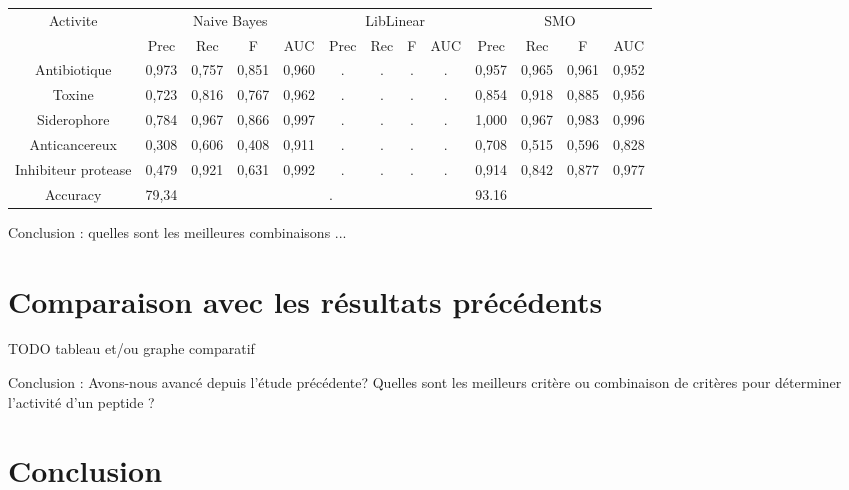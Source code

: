 \documentclass[a4paper,10pt]{report}
\begin{document}
	  
	   \begin{flushleft}
	    \leftskip -3cm
	    \begin{tabular}{|c||c|c|c|c||c|c|c|c||c|c|c|c|}\hline
	      {Activite} & \multicolumn{4}{c||}{Naive Bayes} & \multicolumn{4}{c||}{LibLinear} & \multicolumn{4}{c|}{SMO} \\\cline{2-13}
	      & Prec & Rec & F & AUC & Prec & Rec & F & AUC & Prec & Rec & F & AUC \\\hline
	      Antibiotique &  0,973 & 0,757 & 0,851 & 0,960 & . & . & . & . & 0,957 & 0,965 & 0,961 & 0,952 \\\hline
	      Toxine & 0,723 & 0,816 & 0,767 & 0,962 & . & . & . & . & 0,854 & 0,918 & 0,885 & 0,956  \\\hline
	      Siderophore & 0,784 & 0,967 & 0,866 & 0,997 & . & . & . & . & 1,000 & 0,967 & 0,983 & 0,996  \\\hline
	      Anticancereux & 0,308 & 0,606 & 0,408 & 0,911 & . & . & . & . & 0,708 & 0,515 & 0,596 & 0,828 \\\hline
	      Inhibiteur protease & 0,479 & 0,921 & 0,631 & 0,992 & . & . & . & . & 0,914  & 0,842 & 0,877 & 0,977 \\\hline
	      Accuracy & \multicolumn{4}{l||}{79,34} & \multicolumn{4}{l||}{.} & \multicolumn{4}{l|}{93.16} \\\hline
	    \end{tabular}
	     \label{table 6}
	  \end{flushleft}
	  


	  
	  
	  Conclusion : quelles sont les meilleures combinaisons ... 
      
      \section{Comparaison avec les résultats précédents}
      
	  TODO tableau et/ou graphe comparatif
	  
	  Conclusion : Avons-nous avancé depuis l'étude précédente? Quelles sont les meilleurs critère ou combinaison de critères pour déterminer l'activité d'un peptide ? 
    
  \section*{Conclusion}
     
\end{document}
